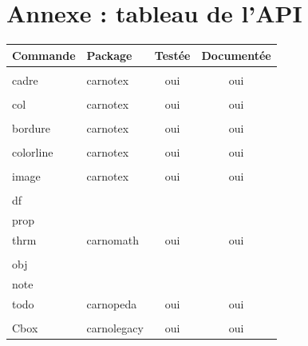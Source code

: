 \documentclass[a4paper,11pt]{article}
\newcommand{\cmd}[1]{\texttt{\char`\\#1}}
\begin{document}
\section{Annexe : tableau de l'API}

\begin{center}
\renewcommand{\arraystretch}{1.3}
\begin{tabular}{|l|l|c|c|}
\hline
\textbf{Commande} & \textbf{Package} & \textbf{Testée} & \textbf{Documentée} \\
\hline
\cmd{cadre} & carnotex & oui & oui \\
\cmd{col} & carnotex & oui & oui \\
\cmd{bordure} & carnotex & oui & oui \\
\cmd{colorline} & carnotex & oui & oui \\
\cmd{image} & carnotex & oui & oui \\
\cmd{df}, \cmd{prop}, \cmd{thrm} & carnomath & oui & oui \\
\cmd{obj}, \cmd{note}, \cmd{todo} & carnopeda & oui & oui \\
\cmd{Cbox} & carnolegacy & oui & oui \\
\hline
\end{tabular}
\end{center}
\end{document}
